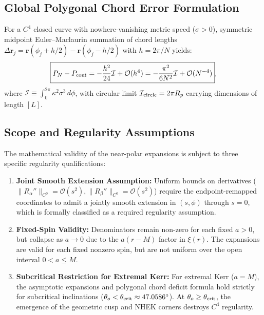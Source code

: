 \subsection{Global Polygonal Chord Error Formulation}
For a $C^4$ closed curve with nowhere-vanishing metric speed ($\sigma > 0$), symmetric midpoint Euler--Maclaurin summation of chord lengths $\Delta\mathbf{r}_j = \mathbf{r}(\phi_j + h/2) - \mathbf{r}(\phi_j - h/2)$ with $h = 2\pi/N$ yields:
\begin{equation}
    \boxed{P_N - P_{\rm cont} = -\frac{h^2}{24}\mathcal{I} + \mathcal{O}(h^4) = -\frac{\pi^2}{6N^2}\mathcal{I} + \mathcal{O}(N^{-4})},
    \label{eq:polygonal_chord_error_formula}
\end{equation}
where $\mathcal{I} \equiv \int_0^{2\pi} \kappa^2 \sigma^3\,d\phi$, with circular limit $\mathcal{I}_{\rm circle} = 2\pi R_p$ carrying dimensions of length $[L]$.

\subsection{Scope and Regularity Assumptions}
The mathematical validity of the near-polar expansions is subject to three specific regularity qualifications:
\begin{enumerate}
    \item \textbf{Joint Smooth Extension Assumption:} Uniform bounds on derivatives ($\|R_\alpha''\|_{C^0} = \mathcal{O}(s^2), \|R_\beta''\|_{C^0} = \mathcal{O}(s^2)$) require the endpoint-remapped coordinates to admit a jointly smooth extension in $(s, \phi)$ through $s = 0$, which is formally classified as a required regularity assumption.
    \item \textbf{Fixed-Spin Validity:} Denominators remain non-zero for each fixed $a > 0$, but collapse as $a \to 0$ due to the $a(r - M)$ factor in $\xi(r)$. The expansions are valid for each fixed nonzero spin, but are not uniform over the open interval $0 < a \le M$.
    \item \textbf{Subcritical Restriction for Extremal Kerr:} For extremal Kerr ($a = M$), the asymptotic expansions and polygonal chord deficit formula hold strictly for subcritical inclinations ($\theta_o < \theta_{\rm crit} \approx 47.0586^\circ$). At $\theta_o \ge \theta_{\rm crit}$, the emergence of the geometric cusp and NHEK corners destroys $C^4$ regularity.
\end{enumerate}
